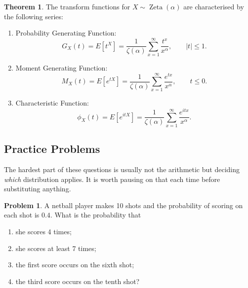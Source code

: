 \documentclass[12pt,a4paper]{report}
\theoremstyle{definition}
\newtheorem{thm}{Theorem}[section]
\theoremstyle{plain}
\theoremstyle{definition}
\newtheorem{problemx}{Problem}[section]
\newenvironment{problem}{\begin{problemx}}{\end{problemx}}
\begin{document}
\begin{thm}
The transform functions for $X \sim \operatorname{Zeta}(\alpha)$ are characterised by the following series:
\begin{enumerate}
\item Probability Generating Function: \[G_X(t) = E\left[t^X\right] = \frac{1}{\zeta(\alpha)} \sum_{x=1}^{\infty} \frac{t^x}{x^{\alpha}}, \quad\quad |t| \le 1.\]
\item Moment Generating Function: \[M_X(t) = E\left[e^{tX}\right] =  \frac{1}{\zeta(\alpha)} \sum_{x=1}^{\infty} \frac{e^{tx}}{x^{\alpha}}, \quad\quad  t \le 0.\]
\item Characteristic Function: \[\phi_X(t) = E\left[e^{itX}\right] =  \frac{1}{\zeta(\alpha)} \sum_{x=1}^{\infty} \frac{e^{itx}}{x^{\alpha}}.\]
\end{enumerate}
\end{thm}
















\subsection{Practice Problems}

The hardest part of these questions is usually not the arithmetic but deciding
\emph{which} distribution applies. It is worth pausing on that each time before
substituting anything.

\begin{problem}
A netball player makes 10 shots and the probability of scoring on each shot is $0.4$.
What is the probability that
\begin{enumerate}
\item[(a).] she scores 4 times;
\item[(b).] she scores at least 7 times;
\item[(c).] the first score occurs on the sixth shot;
\item[(d).] the third score occurs on the tenth shot?
\end{enumerate}
\end{problem}
\end{document}
